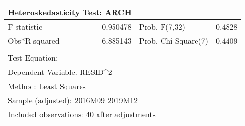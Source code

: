 
\begin{tabular}{lrrrr}
\toprule
\multicolumn{2}{l}{Heteroskedasticity Test: ARCH}&\multicolumn{1}{c}{}&\multicolumn{1}{c}{}&\multicolumn{1}{c}{}\\
\midrule
\multicolumn{1}{l}{F-statistic}&\multicolumn{1}{r}{0.950478}&\multicolumn{2}{l}{Prob. F(7,32)}&\multicolumn{1}{r}{0.4828}\\
\multicolumn{1}{l}{Obs*R-squared}&\multicolumn{1}{r}{6.885143}&\multicolumn{2}{l}{Prob. Chi-Square(7)}&\multicolumn{1}{r}{0.4409}\\
\midrule
\multicolumn{1}{c}{}&\multicolumn{1}{c}{}&\multicolumn{1}{c}{}&\multicolumn{1}{c}{}&\multicolumn{1}{c}{}\\
\multicolumn{1}{l}{Test Equation:}&\multicolumn{1}{c}{}&\multicolumn{1}{c}{}&\multicolumn{1}{c}{}&\multicolumn{1}{c}{}\\
\multicolumn{2}{l}{Dependent Variable: RESID\textasciicircum 2}&\multicolumn{1}{c}{}&\multicolumn{1}{c}{}&\multicolumn{1}{c}{}\\
\multicolumn{2}{l}{Method: Least Squares}&\multicolumn{1}{c}{}&\multicolumn{1}{c}{}&\multicolumn{1}{c}{}\\
\multicolumn{3}{l}{Sample (adjusted): 2016M09 2019M12}&\multicolumn{1}{c}{}&\multicolumn{1}{c}{}\\
\multicolumn{4}{l}{Included observations: 40 after adjustments}&\multicolumn{1}{c}{}\\
\bottomrule
\end{tabular}